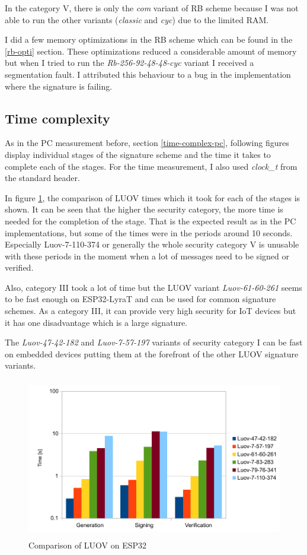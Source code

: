 \documentclass[thesis=M,english]{FITthesis}[2019/12/23]
\begin{document}
\noindent
In the category V, there is only the \textit{com} variant of RB scheme because I was not able to run the other variants (\textit{classic} and \textit{cyc}) due to the limited RAM. 

\bigskip
\noindent
I did a few memory optimizations in the RB scheme which can be found in the \ref{rb-opti} section. These optimizations reduced a considerable amount of memory but when I tried to run the \textit{Rb-256-92-48-48-cyc} variant I received a segmentation fault. I attributed this behaviour to a bug in the implementation where the signature is failing. 

\subsection{Time complexity}
As in the PC measurement before, section \ref{time-complex-pc}, following figures display individual stages of the signature scheme and the time it takes to complete each of the stages. For the time measurement, I also used \textit{clock\_t} from the standard header.

\bigskip
\noindent
In figure \ref{time-luov}, the comparison of LUOV times which it took for each of the stages is shown. It can be seen that the higher the security category, the more time is needed for the completion of the stage. That is the expected result as in the PC implementations, but some of the times were in the periods around 10 seconds. Especially Luov-7-110-374 or generally the whole security category V is unusable with these periods in the moment when a lot of messages need to be signed or verified.

\bigskip
\noindent
Also, category III took a lot of time but the LUOV variant \textit{Luov-61-60-261} seems to be fast enough on ESP32-LyraT and can be used for common signature schemes. As a category III, it can provide very high security for IoT devices but it has one disadvantage which is a large signature. 

\bigskip
\noindent
The \textit{Luov-47-42-182} and \textit{Luov-7-57-197} variants of security category I can be fast on embedded devices putting them at the forefront of the other LUOV signature variants. 

\bigskip
\begin{figure}[H]
\centering
\includegraphics[width=13cm,height=7cm]{images/time-luov.pdf}
\caption{Comparison of LUOV on ESP32}
\label{time-luov}
\end{figure}
\end{document}

